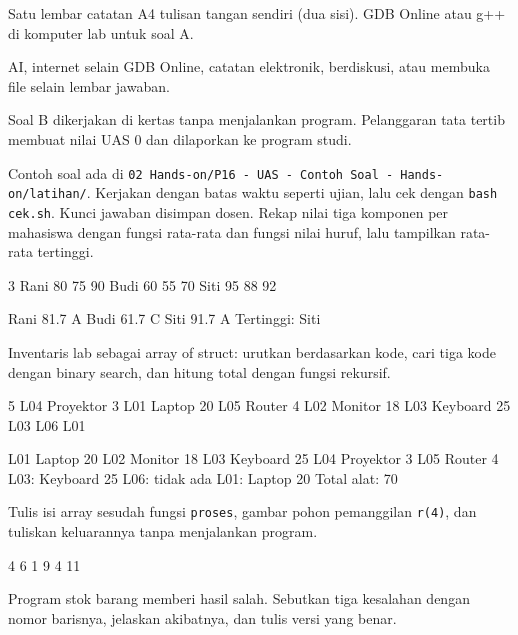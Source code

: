\documentclass[a4paper]{article}
\begin{document}
\begin{Jawaban}
Satu lembar catatan A4 tulisan tangan sendiri (dua sisi). GDB Online atau g++ di komputer lab untuk soal A.
\end{Jawaban}
\begin{Tebak}
AI, internet selain GDB Online, catatan elektronik, berdiskusi, atau membuka file selain lembar jawaban.
\end{Tebak}
\begin{Penting}[]
Soal B dikerjakan di kertas tanpa menjalankan program. Pelanggaran tata tertib membuat nilai UAS 0 dan dilaporkan ke program studi.
\end{Penting}
Contoh soal ada di \texttt{02 Hands-on/P16 - UAS - Contoh Soal - Hands-on/latihan/}. Kerjakan dengan batas waktu seperti ujian, lalu cek dengan \texttt{bash cek.sh}. Kunci jawaban disimpan dosen.
Rekap nilai tiga komponen per mahasiswa dengan fungsi rata-rata dan fungsi nilai huruf, lalu tampilkan rata-rata tertinggi.

\begin{MKeluaran}[title={Contoh masukan}]
3 Rani 80 75 90 Budi 60 55 70 Siti 95 88 92
\end{MKeluaran}
\begin{MKeluaran}[title={Keluaran yang diharapkan}]
Rani 81.7 A
Budi 61.7 C
Siti 91.7 A
Tertinggi: Siti
\end{MKeluaran}
Inventaris lab sebagai array of struct: urutkan berdasarkan kode, cari tiga kode dengan binary search, dan hitung total dengan fungsi rekursif.

\begin{MKeluaran}[title={Contoh masukan}]
5
L04 Proyektor 3
L01 Laptop 20
L05 Router 4
L02 Monitor 18
L03 Keyboard 25
L03 L06 L01
\end{MKeluaran}
\begin{MKeluaran}[title={Keluaran yang diharapkan}]
L01 Laptop 20
L02 Monitor 18
L03 Keyboard 25
L04 Proyektor 3
L05 Router 4
L03: Keyboard 25
L06: tidak ada
L01: Laptop 20
Total alat: 70
\end{MKeluaran}
Tulis isi array sesudah fungsi \texttt{proses}, gambar pohon pemanggilan \texttt{r(4)}, dan tuliskan keluarannya tanpa menjalankan program.

\begin{MKeluaran}[title={Keluaran yang diharapkan}]
4 6 1 9 4 
11
\end{MKeluaran}
Program stok barang memberi hasil salah. Sebutkan tiga kesalahan dengan nomor barisnya, jelaskan akibatnya, dan tulis versi yang benar.
\end{document}
